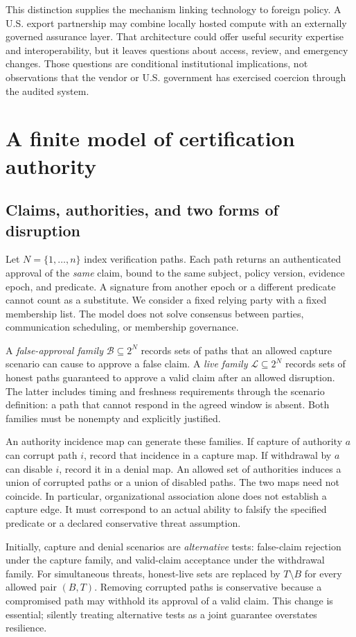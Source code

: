 \documentclass[11pt,letterpaper]{article}
\newcommand{\B}{\mathcal{B}}\newcommand{\Lset}{\mathcal{L}}
\begin{document}
This distinction supplies the mechanism linking technology to foreign policy. A U.S. export partnership may combine locally hosted compute with an externally governed assurance layer. That architecture could offer useful security expertise and interoperability, but it leaves questions about access, review, and emergency changes. Those questions are conditional institutional implications, not observations that the vendor or U.S. government has exercised coercion through the audited system.

\section{A finite model of certification authority}
\subsection{Claims, authorities, and two forms of disruption}
Let $N=\{1,\ldots,n\}$ index verification paths. Each path returns an authenticated approval of the \emph{same} claim, bound to the same subject, policy version, evidence epoch, and predicate. A signature from another epoch or a different predicate cannot count as a substitute. We consider a fixed relying party with a fixed membership list. The model does not solve consensus between parties, communication scheduling, or membership governance.

A \emph{false-approval family} $\B\subseteq 2^N$ records sets of paths that an allowed capture scenario can cause to approve a false claim. A \emph{live family} $\Lset\subseteq 2^N$ records sets of honest paths guaranteed to approve a valid claim after an allowed disruption. The latter includes timing and freshness requirements through the scenario definition: a path that cannot respond in the agreed window is absent. Both families must be nonempty and explicitly justified.

An authority incidence map can generate these families. If capture of authority $a$ can corrupt path $i$, record that incidence in a capture map. If withdrawal by $a$ can disable $i$, record it in a denial map. An allowed set of authorities induces a union of corrupted paths or a union of disabled paths. The two maps need not coincide. In particular, organizational association alone does not establish a capture edge. It must correspond to an actual ability to falsify the specified predicate or a declared conservative threat assumption.

Initially, capture and denial scenarios are \emph{alternative} tests: false-claim rejection under the capture family, and valid-claim acceptance under the withdrawal family. For simultaneous threats, honest-live sets are replaced by $T\setminus B$ for every allowed pair $(B,T)$. Removing corrupted paths is conservative because a compromised path may withhold its approval of a valid claim. This change is essential; silently treating alternative tests as a joint guarantee overstates resilience.
\end{document}
